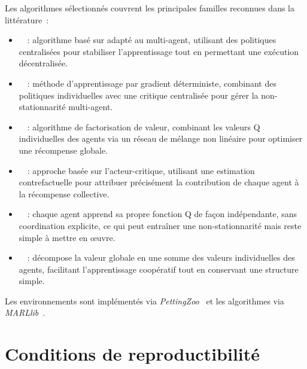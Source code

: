 \medskip

Les algorithmes  sélectionnés couvrent les principales familles reconnues dans la littérature~:
\begin{itemize}
  \item {}~\cite{Yu2022}~: algorithme basé sur  adapté au multi-agent, utilisant des politiques centralisées pour stabiliser l'apprentissage tout en permettant une exécution décentralisée.
  \item {}~\cite{lowe2017multi}~: méthode d'apprentissage par gradient déterministe, combinant des politiques individuelles avec une critique centralisée pour gérer la non-stationnarité multi-agent.
  \item {}~\cite{rashid2018qmix}~: algorithme de factorisation de valeur, combinant les valeurs Q individuelles des agents via un réseau de mélange non linéaire pour optimiser une récompense globale.
  \item {}~\cite{foerster2018counterfactual}~: approche basée sur l'acteur-critique, utilisant une estimation contrefactuelle pour attribuer précisément la contribution de chaque agent à la récompense collective.
  \item {}~\cite{Jiang2022}~: chaque agent apprend sa propre fonction Q de façon indépendante, sans coordination explicite, ce qui peut entraîner une non-stationnarité mais reste simple à mettre en œuvre.
  \item {}~\cite{sunehag2018value}~: décompose la valeur globale en une somme des valeurs individuelles des agents, facilitant l'apprentissage coopératif tout en conservant une structure simple.
\end{itemize}
Les environnements sont implémentés via \textit{PettingZoo}~\cite{terry2020pettingzoo} et les algorithmes via \textit{MARLlib}~\cite{hu2022marllib}.

\section{Conditions de reproductibilité}


